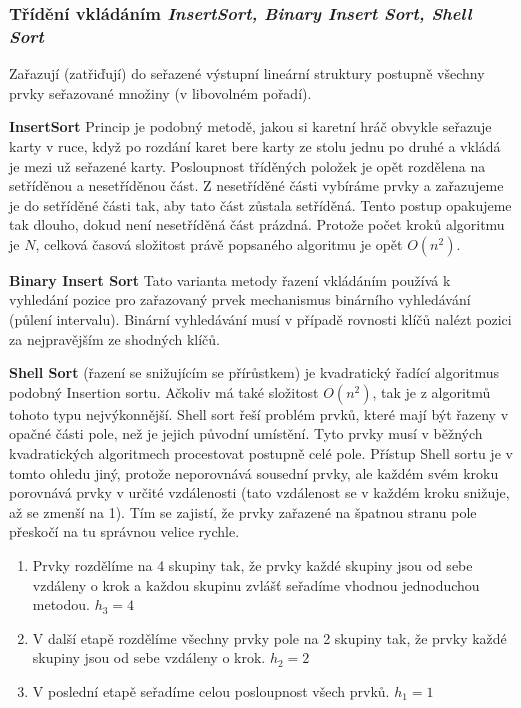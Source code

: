 \subsubsection{Třídění vkládáním \textit{InsertSort, Binary Insert Sort, Shell Sort}}
Zařazují (zatřiďují) do seřazené výstupní lineární struktury postupně všechny prvky seřazované množiny (v libovolném pořadí).

\textbf{InsertSort} Princip je podobný metodě, jakou si karetní hráč obvykle seřazuje karty v ruce, když po rozdání karet bere karty ze stolu jednu po druhé a vkládá je mezi už seřazené karty. Posloupnost tříděných položek je opět rozdělena na setříděnou a nesetříděnou část. Z nesetříděné části vybíráme prvky a zařazujeme je do setříděné části tak, aby tato část zůstala setříděná. Tento postup opakujeme tak dlouho, dokud není nesetříděná část prázdná. Protože počet kroků algoritmu je $N$, celková časová složitost právě popsaného algoritmu je opět $O(n^2)$.

\textbf{Binary Insert Sort} Tato varianta metody řazení vkládáním používá k vyhledání pozice pro zařazovaný prvek mechanismus binárního vyhledávání (půlení intervalu). Binární vyhledávání musí v případě rovnosti klíčů nalézt pozici za nejpravějším ze shodných klíčů.

\textbf{Shell Sort} (řazení se snižujícím se přírůstkem) je kvadratický řadící algoritmus podobný Insertion sortu. Ačkoliv má také složitost $O(n^2)$, tak je z algoritmů tohoto typu nejvýkonnější. Shell sort řeší problém prvků, které mají být řazeny v opačné části pole, než je jejich původní umístění. Tyto prvky musí v běžných kvadratických algoritmech procestovat postupně celé pole. Přístup Shell sortu je v tomto ohledu jiný, protože neporovnává sousední prvky, ale každém svém kroku porovnává prvky v určité vzdálenosti (tato vzdálenost se v každém kroku snižuje, až se zmenší na 1). Tím se zajistí, že prvky zařazené na špatnou stranu pole přeskočí na tu správnou velice rychle. 
\begin{enumerate}
\item Prvky rozdělíme na 4 skupiny tak, že prvky každé skupiny jsou od sebe vzdáleny o krok a každou skupinu zvlášť seřadíme vhodnou jednoduchou metodou. $h_3 = 4$
\item V další etapě rozdělíme všechny prvky pole na 2 skupiny tak, že prvky každé skupiny jsou od sebe vzdáleny o krok. $h_2 = 2$
\item V poslední etapě seřadíme celou posloupnost všech prvků. $h_1 = 1$
\end{enumerate}
